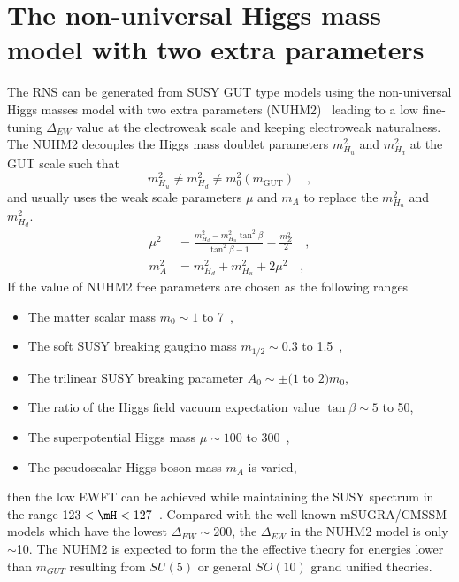 \section{The non-universal Higgs mass model with two extra parameters}
\label{sec:susy_nuhm2}
The RNS can be generated from SUSY GUT type models using the non-universal Higgs masses model with two extra parameters (NUHM2)~\cite{Ellis:2002wv, Ellis:2002iu, Baer:2004fu, Baer:2005bu} leading to a low fine-tuning $\Delta_{EW}$ value at the electroweak scale and keeping electroweak naturalness.
The NUHM2 decouples the Higgs mass doublet parameters $m^{2}_{H_{u}}$ and $m^{2}_{H_{d}}$ at the GUT scale such that
%
\begin{equation}
    m^{2}_{H_{u}} \neq m^{2}_{H_{d}} \neq m^{2}_{0}(m_{\text{GUT}}) \quad ,
    \label{eq:susy_nuhm2_decouple}
\end{equation}
%
and usually uses the weak scale parameters $\mu$ and $m_{A}$ to replace the $m^{2}_{H_{u}}$ and $m^{2}_{H_{d}}$.
%
\begin{align}
    \mu^{2} &= \frac{m^{2}_{H_{d}} - m^{2}_{H_{u}}\tan^{2}\beta}{\tan^{2}\beta - 1} - \frac{m^{2}_{Z}}{2} \quad ,\\
    m^{2}_{A} &= m^{2}_{H_{d}} + m^{2}_{H_{u}} + 2\mu^{2} \quad ,
    \label{eq:susy_weak_scale_parameters}
\end{align}
%
If the value of NUHM2 free parameters are chosen as the following ranges
%
\begin{itemize}
    \item The matter scalar mass $m_{0} \sim 1$ to 7~{\TeV},
    \item The soft SUSY breaking gaugino mass $m_{1/2} \sim 0.3$ to 1.5~{\TeV},
    \item The trilinear SUSY breaking parameter $A_{0} \sim \pm(1$ to $2) m_{0}$,
    \item The  ratio of the Higgs field vacuum expectation value $\tan\beta \sim 5$ to 50,
    \item The superpotential Higgs mass $\mu \sim 100$ to 300~{\GeV},
    \item The pseudoscalar Higgs boson mass $m_{A}$ is varied,
\end{itemize}
%
then the low EWFT can be achieved while maintaining the SUSY spectrum in the range $123 < \mH < 127$~{\GeV}.
Compared with the well-known mSUGRA/CMSSM models which have the lowest $\Delta_{EW} \sim 200$, the $\Delta_{EW}$ in the NUHM2 model is only $\sim$10.
The NUHM2 is expected to form the the effective theory for energies lower than $m_{GUT}$ resulting from $SU(5)$ or general $SO(10)$ grand unified theories.
